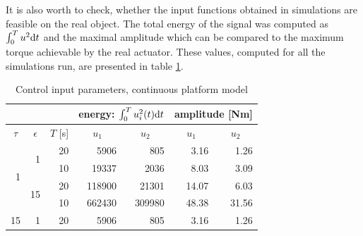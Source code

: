 It is also worth to check, whether the input functions obtained in simulations
are feasible on the real object. The total energy of the signal was computed as $\int_0^T u^2\mathrm{d} t$
and the maximal amplitude which can be compared to the maximum torque achievable by the real actuator.
These values, computed for all the simulations run, are presented in table \ref{tab:control}.
\begin{table}[h]
\centering
\caption{Control input parameters, continuous platform model}
\label{tab:control}
\begin{tabular}{rrr|r|r|r|r|}
\cline{4-7}
\multicolumn{1}{c}{}                      & \multicolumn{1}{c}{}                     & \multicolumn{1}{c|}{}            & \multicolumn{2}{c|}{energy: $\int_0^Tu_i^2(t)\mathrm{d} t$}                             & \multicolumn{2}{c|}{amplitude [Nm]}                          \\ \hline
\multicolumn{1}{|c|}{$\tau$}              & \multicolumn{1}{c|}{$\epsilon$}          & \multicolumn{1}{c|}{$T$ {[}s{]}} & \multicolumn{1}{c|}{$u_1$} & \multicolumn{1}{c|}{$u_2$} & \multicolumn{1}{c|}{$u_1$} & \multicolumn{1}{c|}{$u_2$} \\ \hline
\multicolumn{1}{|r|}{\multirow{4}{*}{1}}  & \multicolumn{1}{r|}{\multirow{2}{*}{1}}  & 20                               & 5906                       & 805                        & 3.16                       & 1.26                       \\ \cline{3-7} 
\multicolumn{1}{|r|}{}                    & \multicolumn{1}{r|}{}                    & 10                               & 19337                      & 2036                       & 8.03                       & 3.09                       \\ \cline{2-7} 
\multicolumn{1}{|r|}{}                    & \multicolumn{1}{r|}{\multirow{2}{*}{15}} & 20                               & 118900                     & 21301                      & 14.07                      & 6.03                       \\ \cline{3-7} 
\multicolumn{1}{|r|}{}                    & \multicolumn{1}{r|}{}                    & 10                               & 662430                     & 309980                     & 48.38                      & 31.56                      \\ \hline
\multicolumn{1}{|r|}{\multirow{4}{*}{15}} & \multicolumn{1}{r|}{\multirow{2}{*}{1}}  & 20                               & 5906                       & 805                        & 3.16                       & 1.26                       \\ \cline{3-7} 

\end{tabular}
\end{table}
